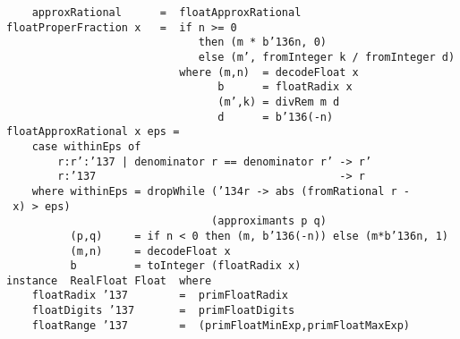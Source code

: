 \mbox{\tt \ \ \ \ approxRational\ \ \ \ \ \ =\ \ floatApproxRational}
\eprogB\noindent\bprogB
\mbox{\tt floatProperFraction\ x\ \ \ =\ \ if\ n\ >=\ 0}\\
\mbox{\tt \ \ \ \ \ \ \ \ \ \ \ \ \ \ \ \ \ \ \ \ \ \ \ \ \ \ \ \ \ \ then\ (m\ *\ b{\char'136}n,\ 0)}\\
\mbox{\tt \ \ \ \ \ \ \ \ \ \ \ \ \ \ \ \ \ \ \ \ \ \ \ \ \ \ \ \ \ \ else\ (m',\ fromInteger\ k\ /\ fromInteger\ d)}\\
\mbox{\tt \ \ \ \ \ \ \ \ \ \ \ \ \ \ \ \ \ \ \ \ \ \ \ \ \ \ \ where\ (m,n)\ \ =\ decodeFloat\ x}\\
\mbox{\tt \ \ \ \ \ \ \ \ \ \ \ \ \ \ \ \ \ \ \ \ \ \ \ \ \ \ \ \ \ \ \ \ \ b\ \ \ \ \ \ =\ floatRadix\ x}\\
\mbox{\tt \ \ \ \ \ \ \ \ \ \ \ \ \ \ \ \ \ \ \ \ \ \ \ \ \ \ \ \ \ \ \ \ \ (m',k)\ =\ divRem\ m\ d}\\
\mbox{\tt \ \ \ \ \ \ \ \ \ \ \ \ \ \ \ \ \ \ \ \ \ \ \ \ \ \ \ \ \ \ \ \ \ d\ \ \ \ \ \ =\ b{\char'136}(-n)}\\
\mbox{\tt floatApproxRational\ x\ eps\ =}\\
\mbox{\tt \ \ \ \ case\ withinEps\ of}\\
\mbox{\tt \ \ \ \ \ \ \ \ r:r':{\char'137}\ |\ denominator\ r\ ==\ denominator\ r'\ ->\ r'}\\
\mbox{\tt \ \ \ \ \ \ \ \ r:{\char'137}\ \ \ \ \ \ \ \ \ \ \ \ \ \ \ \ \ \ \ \ \ \ \ \ \ \ \ \ \ \ \ \ \ \ \ \ \ \ ->\ r}\\
\mbox{\tt \ \ \ \ where\ withinEps\ =\ dropWhile\ ({\char'134}r\ ->\ abs\ (fromRational\ r\ -\ x)\ >\ eps)}\\
\mbox{\tt \ \ \ \ \ \ \ \ \ \ \ \ \ \ \ \ \ \ \ \ \ \ \ \ \ \ \ \ \ \ \ \ (approximants\ p\ q)}\\
\mbox{\tt \ \ \ \ \ \ \ \ \ \ (p,q)\ \ \ \ \ =\ if\ n\ <\ 0\ then\ (m,\ b{\char'136}(-n))\ else\ (m*b{\char'136}n,\ 1)}\\
\mbox{\tt \ \ \ \ \ \ \ \ \ \ (m,n)\ \ \ \ \ =\ decodeFloat\ x}\\
\mbox{\tt \ \ \ \ \ \ \ \ \ \ b\ \ \ \ \ \ \ \ \ =\ toInteger\ (floatRadix\ x)}
\eprogB\noindent\bprogB
\mbox{\tt instance\ \ RealFloat\ Float\ \ where}\\
\mbox{\tt \ \ \ \ floatRadix\ {\char'137}\ \ \ \ \ \ \ \ =\ \ primFloatRadix}\\
\mbox{\tt \ \ \ \ floatDigits\ {\char'137}\ \ \ \ \ \ \ =\ \ primFloatDigits}\\
\mbox{\tt \ \ \ \ floatRange\ {\char'137}\ \ \ \ \ \ \ \ =\ \ (primFloatMinExp,primFloatMaxExp)}\\
